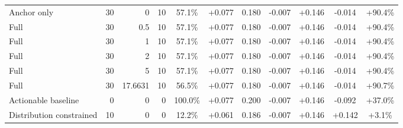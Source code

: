 \begin{table}[htbp]
\begin{tabular}{lrrrccccccc}
Anchor only & 30 & 0 & 10 & 57.1\% & +0.077 & 0.180 & -0.007 & +0.146 & -0.014 & +90.4\% \\
Full & 30 & 0.5 & 10 & 57.1\% & +0.077 & 0.180 & -0.007 & +0.146 & -0.014 & +90.4\% \\
Full & 30 & 1 & 10 & 57.1\% & +0.077 & 0.180 & -0.007 & +0.146 & -0.014 & +90.4\% \\
Full & 30 & 2 & 10 & 57.1\% & +0.077 & 0.180 & -0.007 & +0.146 & -0.014 & +90.4\% \\
Full & 30 & 5 & 10 & 57.1\% & +0.077 & 0.180 & -0.007 & +0.146 & -0.014 & +90.4\% \\
Full & 30 & 17.6631 & 10 & 56.5\% & +0.077 & 0.180 & -0.007 & +0.146 & -0.014 & +90.7\% \\
Actionable baseline & 0 & 0 & 0 & 100.0\% & +0.077 & 0.200 & -0.007 & +0.146 & -0.092 & +37.0\% \\
Distribution constrained & 10 & 0 & 0 & 12.2\% & +0.061 & 0.186 & -0.007 & +0.146 & +0.142 & +3.1\% \\
\bottomrule
\end{tabular}
\end{table}